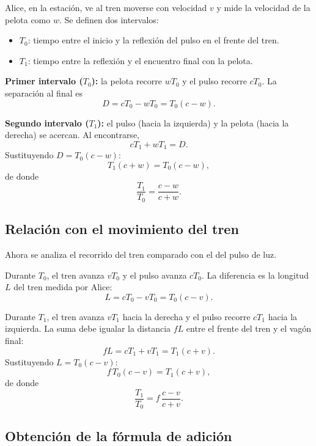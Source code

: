 Alice, en la estación, ve al tren moverse con velocidad $v$ y mide la velocidad de la pelota como $w$. Se definen dos intervalos:
\begin{itemize}
    \item $T_0$: tiempo entre el inicio y la reflexión del pulso en el frente del tren.
    \item $T_1$: tiempo entre la reflexión y el encuentro final con la pelota.
\end{itemize}



\textbf{Primer intervalo ($T_0$):} la pelota recorre $wT_0$ y el pulso recorre $cT_0$. La separación al final es
$$
D = cT_0 - wT_0 = T_0(c - w).
$$



\textbf{Segundo intervalo ($T_1$):} el pulso (hacia la izquierda) y la pelota (hacia la derecha) se acercan. Al encontrarse,
$$
cT_1 + wT_1 = D.
$$
Sustituyendo $D = T_0(c - w)$:
$$
T_1(c + w) = T_0(c - w),
$$
de donde
\begin{equation*}
    \frac{T_1}{T_0}=\frac{c-w}{c+w}.
    \tag{3.2}
\end{equation*}

\subsection{Relación con el movimiento del tren}

Ahora se analiza el recorrido del tren comparado con el del pulso de luz.



Durante $T_0$, el tren avanza $vT_0$ y el pulso avanza $cT_0$. La diferencia es la longitud $L$ del tren medida por Alice:
$$
L = cT_0 - vT_0 = T_0(c - v).
$$



Durante $T_1$, el tren avanza $vT_1$ hacia la derecha y el pulso recorre $cT_1$ hacia la izquierda. La suma debe igualar la distancia $fL$ entre el frente del tren y el vagón final:
$$
fL = cT_1 + vT_1 = T_1(c + v).
$$
Sustituyendo $L = T_0(c - v)$:
$$
f\,T_0(c - v) = T_1(c + v),
$$
de donde
\begin{equation*}
    \frac{T_1}{T_0}=f\,\frac{c-v}{c+v}.
    \tag{*}
\end{equation*}

\subsection{Obtención de la fórmula de adición}

